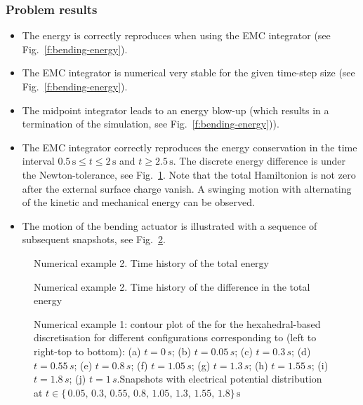\subsubsection{Problem results}
\begin{itemize}
\item The energy is correctly reproduces when using the EMC integrator (see Fig.~\ref{f:bending-energy}).
\item The EMC integrator is numerical very stable for the given time-step size (see Fig.~\ref{f:bending-energy}).
\item The midpoint integrator leads to an energy blow-up (which results in a termination of the simulation, see Fig.~\ref{f:bending-energy})).
\item The EMC integrator correctly reproduces the energy conservation in the time interval  $0.5\,\text{s} \leq t\leq2\,\text{s}$ and $t\geq2.5\,\text{s}$. 
The discrete energy difference is under the Newton-tolerance, see Fig.~\ref{f:bending-energydiff}.
Note that the total Hamiltonion is not zero after the external surface charge vanish.
A swinging motion with alternating of the kinetic and mechanical energy can be observed.
\item The motion of the bending actuator is illustrated with a sequence of subsequent snapshots, see Fig.~\ref{f:bending-snaps}.
 
\end{itemize}

\begin{figure}[h!]
\begin{minipage}[b!]{0.475\textwidth}
\centering
   \setlength{\figH}{0.25\textheight}
					\setlength{\figW}{0.8\textwidth}
					
  \caption{Numerical example 2. Time history of the total energy}
  \label{f:bending-energy}
\end{minipage}
\hfill
\begin{minipage}[b!]{0.475\textwidth}
   \centering
   \setlength{\figH}{0.25\textheight}
					\setlength{\figW}{0.8\textwidth}
   
  \caption{Numerical example 2. Time history of the difference in the total energy}
  \label{f:bending-energydiff}
\end{minipage}
\end{figure}



\begin{figure}[h!]
\centering
  \caption{Numerical example 1: contour plot of the  for the hexahedral-based discretisation for different configurations corresponding to (left to right-top to bottom): (a) $t=0\,s$; (b) $t=0.05\,s$;  (c) $t=0.3\,s$; (d) $t=0.55\,s$; (e) $t=0.8\,s$; (f) $t=1.05\,s$; (g) $t=1.3\,s$; (h) $t=1.55\,s$; (i) $t=1.8\,s$; (j) $t=1\,s$.Snapshots with electrical potential distribution at  $t\in\{\,0.05,\,  0.3  , \, 0.55  , \, 0.8  , \, 1.05 ,  \, 1.3   , \,1.55   ,\, 1.8\}\,\text{s} $}
  \label{f:bending-snaps}
\end{figure}


